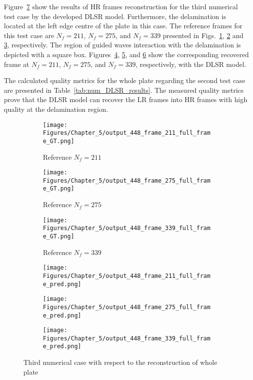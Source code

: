 Figure~\ref{fig:num_results_CS_448} show the results of HR frames reconstruction for the third numerical test case by the developed DLSR model.
Furthermore, the delamination is located at the left edge centre of the plate in this case.
The reference frames for this test case are $N_f=211$, $N_f=275$, and $N_f=339$ presented in Figs.~\ref{fig:ref_448_full_211}, \ref{fig:ref_448_full_275} and \ref{fig:ref_448_full_339}, respectively.
The region of guided waves interaction with the delamination is depicted with a square box.
Figures~\ref{fig:pred_448_full_211}, \ref{fig:pred_448_full_275}, and \ref{fig:pred_448_full_339} show the corresponding recovered frame at $N_f=211$, $N_f=275$, and $N_f=339$, respectively, with the DLSR model.

The calculated quality metrics for the whole plate regarding the second test case are presented in Table~\ref{tab:num_DLSR_results}.
The measured quality metrics prove that the DLSR model can recover the LR frames into HR frames with high quality at the delamination region.
\begin{figure} [!ht]
	\centering
	\begin{subfigure}[b]{.32\textwidth}
		\centering
		\texttt{[image: Figures/Chapter\_5/output\_448\_frame\_211\_full\_frame\_GT.png]}
		\caption{Reference $N_f=211$}
		\label{fig:ref_448_full_211}
	\end{subfigure}
	\begin{subfigure}[b]{.32\textwidth}
		\centering
		\texttt{[image: Figures/Chapter\_5/output\_448\_frame\_275\_full\_frame\_GT.png]}
		\caption{Reference $N_f=275$}
		\label{fig:ref_448_full_275}
	\end{subfigure}
	\begin{subfigure}[b]{.32\textwidth}
		\centering
		\texttt{[image: Figures/Chapter\_5/output\_448\_frame\_339\_full\_frame\_GT.png]}
		\caption{Reference $N_f=339$}
		\label{fig:ref_448_full_339}	
	\end{subfigure}
	\begin{subfigure}[b]{.32\textwidth}
		\centering
		\texttt{[image: Figures/Chapter\_5/output\_448\_frame\_211\_full\_frame\_pred.png]}
		\caption{}
		\label{fig:pred_448_full_211}
	\end{subfigure}
	\begin{subfigure}[b]{.32\textwidth}
		\centering
		\texttt{[image: Figures/Chapter\_5/output\_448\_frame\_275\_full\_frame\_pred.png]}
		\caption{}
		\label{fig:pred_448_full_275}
	\end{subfigure}
	\begin{subfigure}[b]{.32\textwidth}
		\centering
		\texttt{[image: Figures/Chapter\_5/output\_448\_frame\_339\_full\_frame\_pred.png]}
		\caption{}
		\label{fig:pred_448_full_339}	
	\end{subfigure}
	\caption{Third numerical case with respect to the reconstruction of whole plate}
	\label{fig:num_results_CS_448}
\end{figure}

